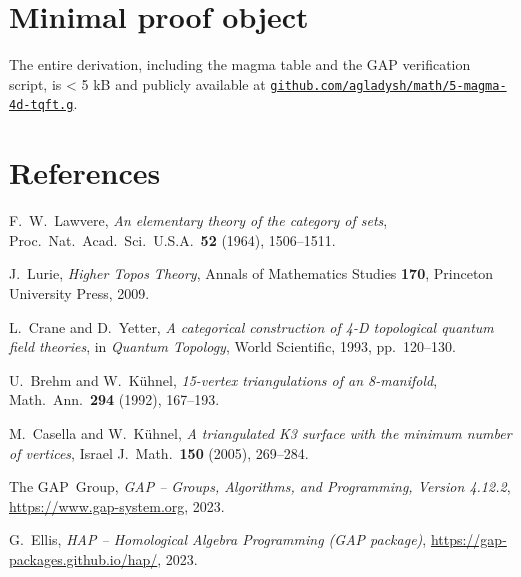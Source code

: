 \documentclass[11pt]{article}
\begin{document}
\section{Minimal proof object}
The entire derivation, including the magma table and the GAP verification script, is < 5 kB and publicly available at
\href{https://github.com/agladysh/math/5-magma-4d-tqft.g}{\texttt{github.com/agladysh/math/5-magma-4d-tqft.g}}.

\section*{References}
\begingroup
\renewcommand{\section}[2]{}   %
\begin{thebibliography}{99}

F.~W.~Lawvere, \textit{An elementary theory of the category of sets}, Proc.\ Nat.\ Acad.\ Sci.\ U.S.A.\ \textbf{52} (1964), 1506--1511.

J.~Lurie, \textit{Higher Topos Theory}, Annals of Mathematics Studies \textbf{170}, Princeton University Press, 2009.

L.~Crane and D.~Yetter, \textit{A categorical construction of 4-D topological quantum field theories}, in \textit{Quantum Topology}, World Scientific, 1993, pp.\ 120--130.

U.~Brehm and W.~Kühnel, \textit{15-vertex triangulations of an 8-manifold}, Math.\ Ann.\ \textbf{294} (1992), 167--193.

M.~Casella and W.~Kühnel, \textit{A triangulated K3 surface with the minimum number of vertices}, Israel J.\ Math.\ \textbf{150} (2005), 269--284.

The GAP~Group, \textit{GAP -- Groups, Algorithms, and Programming, Version 4.12.2}, \url{https://www.gap-system.org}, 2023.

G.~Ellis, \textit{HAP -- Homological Algebra Programming (GAP package)}, \url{https://gap-packages.github.io/hap/}, 2023.

\end{thebibliography}
\endgroup

\section*{Open Problems \& Conjectures}
\end{document}
